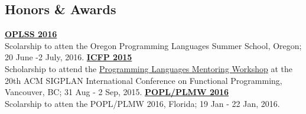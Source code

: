 \documentclass[margin,line]{resume}
\begin{document}
\begin{resume}
    \section{\mysidestyle Honors \& Awards} 

    {\bf \href{https://www.cs.uoregon.edu/research/summerschool/summer16/}{OPLSS
      2016}}\\
    Scolarship to atten the Oregon Programming Languages Summer School, Oregon; 20 June -2 July, 2016.
    {\bf \href{http://icfpconference.org/icfp2015/}{ICFP 2015}}\\
    Scholarship to attend the
    \href{https://www.cis.upenn.edu/~sweirich/icfp-plmw15/}{Programming 
    Languages Mentoring Workshop} at the
    20th ACM SIGPLAN International Conference on Functional Programming, 
    Vancouver, BC; 31 Aug - 2 Sep, 2015.
    {\bf \href{http://conf.researchr.org/home/PLMW-2016}{POPL/PLMW 2016}}\\
    Scolarship to atten the POPL/PLMW 2016, Florida; 19 Jan - 22 Jan, 2016.

\end{resume}
\end{document}
